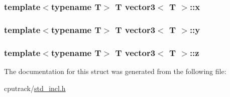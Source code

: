 \subsubsection[{\texorpdfstring{x}{x}}]{\setlength{\rightskip}{0pt plus 5cm}template$<$typename T$>$ T {\bf vector3}$<$ T $>$\+::x}\hypertarget{structvector3_a5b466692e9550284d17a1bee6a6b8518}{}\label{structvector3_a5b466692e9550284d17a1bee6a6b8518}
\subsubsection[{\texorpdfstring{y}{y}}]{\setlength{\rightskip}{0pt plus 5cm}template$<$typename T$>$ T {\bf vector3}$<$ T $>$\+::y}\hypertarget{structvector3_a1faa20a703bae3d1a673856466758383}{}\label{structvector3_a1faa20a703bae3d1a673856466758383}
\subsubsection[{\texorpdfstring{z}{z}}]{\setlength{\rightskip}{0pt plus 5cm}template$<$typename T$>$ T {\bf vector3}$<$ T $>$\+::z}\hypertarget{structvector3_a90c50e80a32423d5cc76f40e5f53ffbe}{}\label{structvector3_a90c50e80a32423d5cc76f40e5f53ffbe}


The documentation for this struct was generated from the following file\+:\begin{DoxyCompactItemize}
\item 
cputrack/\hyperlink{std__incl_8h}{std\+\_\+incl.\+h}\end{DoxyCompactItemize}
